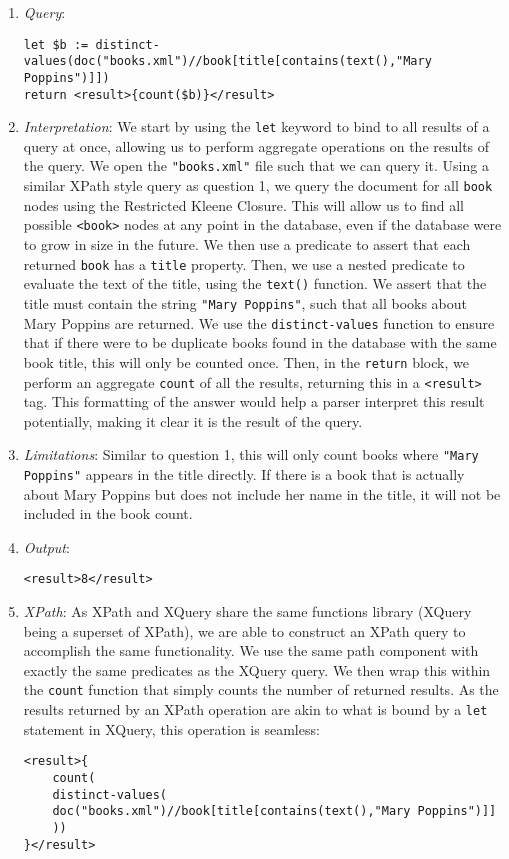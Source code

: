 \documentclass[11pt]{article}
\begin{document}
\begin{enumerate}
\item \textit{Query}:
\begin{small}
\begin{verbatim}
let $b := distinct-values(doc("books.xml")//book[title[contains(text(),"Mary Poppins")]])
return <result>{count($b)}</result>
\end{verbatim}
\end{small}

\item \textit{Interpretation}: We start by using the \texttt{let} keyword to bind to all results of a query at once, allowing us to perform aggregate operations on the results of the query. We open the \texttt{"books.xml"} file such that we can query it. Using a similar XPath style query as question 1, we query the document for all \texttt{book} nodes using the Restricted Kleene Closure. This will allow us to find all possible \texttt{<book>} nodes at any point in the database, even if the database were to grow in size in the future. We then use a predicate to assert that each returned \texttt{book} has a \texttt{title} property. Then, we use a nested predicate to evaluate the text of the title, using the \texttt{text()} function. We assert that the title must contain the string \texttt{"Mary Poppins"}, such that all books about Mary Poppins are returned. We use the \texttt{distinct-values} function to ensure that if there were to be duplicate books found in the database with the same book title, this will only be counted once. Then, in the \texttt{return} block, we perform an aggregate \texttt{count} of all the results, returning this in a \texttt{<result>} tag. This formatting of the answer would help a parser interpret this result potentially, making it clear it is the result of the query.

\item \textit{Limitations}: Similar to question 1, this will only count books where \texttt{"Mary Poppins"} appears in the title directly. If there is a book that is actually about Mary Poppins but does not include her name in the title, it will not be included in the book count.

\item \textit{Output}:
\begin{verbatim}
<result>8</result>
\end{verbatim} 

\item \textit{XPath}: As XPath and XQuery share the same functions library (XQuery being a superset of XPath), we are able to construct an XPath query to accomplish the same functionality. We use the same path component with exactly the same predicates as the XQuery query. We then wrap this within the \texttt{count} function that simply counts the number of returned results. As the results returned by an XPath operation are akin to what is bound by a \texttt{let} statement in XQuery, this operation is seamless:
\begin{verbatim}
<result>{
    count(
    distinct-values(
    doc("books.xml")//book[title[contains(text(),"Mary Poppins")]]
    ))
}</result>
\end{verbatim}


\end{enumerate}
\end{document}
